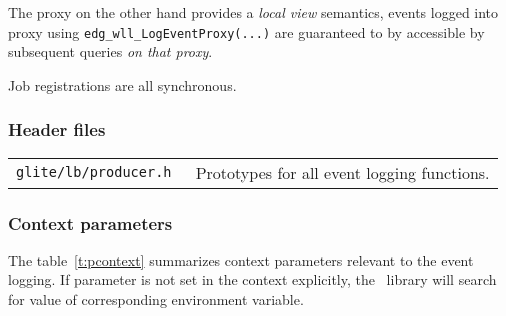The \LB proxy on the other hand provides a \emph{local view}
semantics, events logged into proxy using
\verb'edg_wll_LogEventProxy(...)' are guaranteed to by accessible by
subsequent queries \emph{on that proxy}.

Job registrations are all synchronous.

\subsubsection{Header files}

\begin{table}[h]
\begin{tabularx}{\textwidth}{>{\tt}lX}
glite/lb/producer.h & Prototypes for all event logging functions. \\
\end{tabularx}
\end{table}

\subsubsection{Context parameters}
The table~\ref{t:pcontext} summarizes context parameters relevant to the
event logging. If  parameter is not set in the context explicitly, the
\LB\ library will search for value of corresponding environment
variable.

